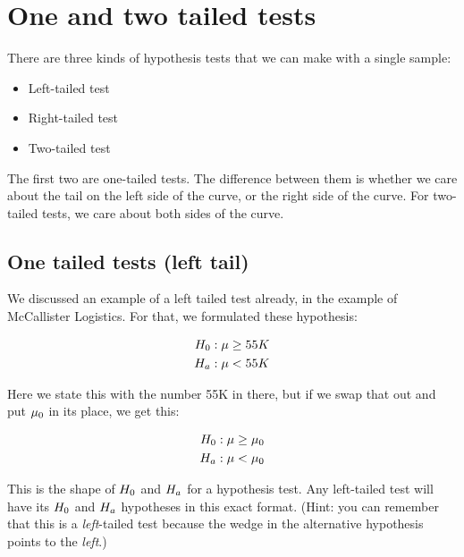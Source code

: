 \documentclass[../../../main.tex]{subfiles}
\begin{document}
\chapter{One and two tailed tests}

There are three kinds of hypothesis tests that we can make with a single sample:

\begin{itemize}
  \item Left-tailed test
  \item Right-tailed test
  \item Two-tailed test
\end{itemize}

\noindent
The first two are one-tailed tests. The difference between them is whether we care about the tail on the left side of the curve, or the right side of the curve. For two-tailed tests, we care about both sides of the curve.


\section{One tailed tests (left tail)}

We discussed an example of a left tailed test already, in the example of McCallister Logistics. For that, we formulated these hypothesis:

\begin{align*}
  \NullHyp/: \populationmean \geq 55K \\
  \AltHyp/: \populationmean < 55K
\end{align*}

\noindent
Here we state this with the number 55K in there, but if we swap that out and put $\HypPopMean/$ in its place, we get this:

\begin{align*}
  \NullHyp/: \populationmean \geq \HypPopMean/ \\
  \AltHyp/: \populationmean < \HypPopMean/
\end{align*}

\noindent
This is the shape of $\NullHyp/$ and $\AltHyp/$ for a  hypothesis test. Any left-tailed test will have its $\NullHyp/$ and $\AltHyp/$ hypotheses in this exact format. (Hint: you can remember that this is a \emph{left}-tailed test because the wedge in the alternative hypothesis points to the \emph{left}.)
\end{document}
